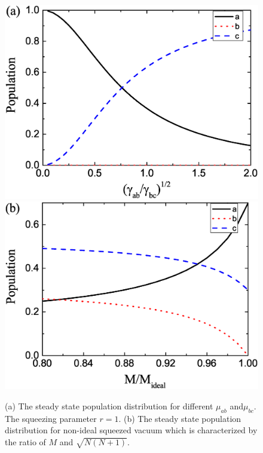 \documentclass[aps,showpacs,twocolumn,twoside,groupedaddress]{revtex4}
\begin{document}
\begin{figure}
\includegraphics[width=0.9\columnwidth]{pop1.eps}
\includegraphics[width=0.9\columnwidth]{pop2.eps}
\caption{(a) The steady state population distribution for different $\mu_{ab}$ and$\mu_{bc}$. The squeezing parameter $r=1$. (b) The steady state population distribution for non-ideal squeezed vacuum which is characterized by the ratio of $M$ and $\sqrt{N(N+1)}$. }
\label{2}
\end{figure}
\end{document}
